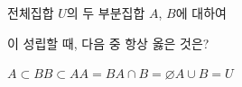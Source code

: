 전체집합 $U$의 두 부분집합 $A$, $B$에 대하여\par\smallskip{}\par\smallskip\noindent 이 성립할 때, 다음 중 항상 옳은 것은?
\begin{choices32}{$A\subset B$}{$B\subset A$}{$A=B$}{$A\cap B=\varnothing$}{$A\cup B=U$}\end{choices32}
